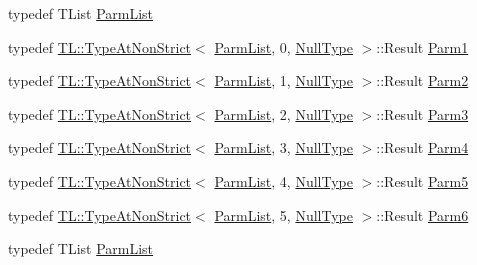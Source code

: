 \begin{DoxyCompactItemize}
\item 
typedef T\+List \mbox{\hyperlink{classUtil_1_1ObjectFactory_a46f003a5928e8a60140e0a74ac261c36}{Parm\+List}}
\item 
typedef \mbox{\hyperlink{structUtil_1_1TL_1_1TypeAtNonStrict}{T\+L\+::\+Type\+At\+Non\+Strict}}$<$ \mbox{\hyperlink{classUtil_1_1ObjectFactory_a46f003a5928e8a60140e0a74ac261c36}{Parm\+List}}, 0, \mbox{\hyperlink{classUtil_1_1NullType}{Null\+Type}} $>$\+::Result \mbox{\hyperlink{classUtil_1_1ObjectFactory_a47e4f863537be7a4f5f5972691bb0b57}{Parm1}}
\item 
typedef \mbox{\hyperlink{structUtil_1_1TL_1_1TypeAtNonStrict}{T\+L\+::\+Type\+At\+Non\+Strict}}$<$ \mbox{\hyperlink{classUtil_1_1ObjectFactory_a46f003a5928e8a60140e0a74ac261c36}{Parm\+List}}, 1, \mbox{\hyperlink{classUtil_1_1NullType}{Null\+Type}} $>$\+::Result \mbox{\hyperlink{classUtil_1_1ObjectFactory_ae438d0c17d1510e6fd7db9ac479a371f}{Parm2}}
\item 
typedef \mbox{\hyperlink{structUtil_1_1TL_1_1TypeAtNonStrict}{T\+L\+::\+Type\+At\+Non\+Strict}}$<$ \mbox{\hyperlink{classUtil_1_1ObjectFactory_a46f003a5928e8a60140e0a74ac261c36}{Parm\+List}}, 2, \mbox{\hyperlink{classUtil_1_1NullType}{Null\+Type}} $>$\+::Result \mbox{\hyperlink{classUtil_1_1ObjectFactory_ae5c679dd2f210e0a5ad257b336f754fb}{Parm3}}
\item 
typedef \mbox{\hyperlink{structUtil_1_1TL_1_1TypeAtNonStrict}{T\+L\+::\+Type\+At\+Non\+Strict}}$<$ \mbox{\hyperlink{classUtil_1_1ObjectFactory_a46f003a5928e8a60140e0a74ac261c36}{Parm\+List}}, 3, \mbox{\hyperlink{classUtil_1_1NullType}{Null\+Type}} $>$\+::Result \mbox{\hyperlink{classUtil_1_1ObjectFactory_a052f09d9e81b11d98bb53a52f327cf01}{Parm4}}
\item 
typedef \mbox{\hyperlink{structUtil_1_1TL_1_1TypeAtNonStrict}{T\+L\+::\+Type\+At\+Non\+Strict}}$<$ \mbox{\hyperlink{classUtil_1_1ObjectFactory_a46f003a5928e8a60140e0a74ac261c36}{Parm\+List}}, 4, \mbox{\hyperlink{classUtil_1_1NullType}{Null\+Type}} $>$\+::Result \mbox{\hyperlink{classUtil_1_1ObjectFactory_a11006cc1ea90957dd8e5604c2d9e069d}{Parm5}}
\item 
typedef \mbox{\hyperlink{structUtil_1_1TL_1_1TypeAtNonStrict}{T\+L\+::\+Type\+At\+Non\+Strict}}$<$ \mbox{\hyperlink{classUtil_1_1ObjectFactory_a46f003a5928e8a60140e0a74ac261c36}{Parm\+List}}, 5, \mbox{\hyperlink{classUtil_1_1NullType}{Null\+Type}} $>$\+::Result \mbox{\hyperlink{classUtil_1_1ObjectFactory_a9f80d25e0964c0e4c204373cd651397a}{Parm6}}
\item 
typedef T\+List \mbox{\hyperlink{classUtil_1_1ObjectFactory_a46f003a5928e8a60140e0a74ac261c36}{Parm\+List}}

\end{DoxyCompactItemize}
